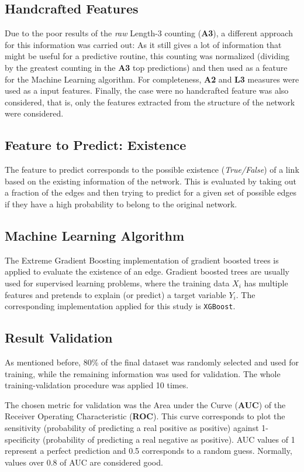 \subsection*{Handcrafted Features}

Due to the poor results of the \emph{raw} Length-3 counting (\textbf{A3}),
a different approach for this information was carried out: As it still
gives a lot of information that might be useful for a predictive routine,
this counting was normalized (dividing by the greatest counting in
the \textbf{A3} top predictions) and then used as a feature for the
Machine Learning algorithm. For completeness, \textbf{A2} and \textbf{L3}
measures were used as a input features. Finally, the case were no
handcrafted feature was also considered, that is, only the features
extracted from the structure of the network were considered.

\subsection*{Feature to Predict: Existence}

The feature to predict corresponds to the possible existence (\emph{True/False})
of a link based on the existing information of the network. This is
evaluated by taking out a fraction of the edges and then trying to
predict for a given set of possible edges if they have a high probability
to belong to the original network.

\subsection*{Machine Learning Algorithm}

The Extreme Gradient Boosting implementation of gradient boosted trees
is applied to evaluate the existence of an edge. Gradient boosted
trees are usually used for supervised learning problems, where the
training data $X_{i}$ has multiple features and pretends to explain
(or predict) a target variable $Y_{i}$. The corresponding implementation
applied for this study is \texttt{XGBoost}.

\subsection*{Result Validation}

As mentioned before, 80\% of the final dataset was randomly selected
and used for training, while the remaining information was used for
validation. The whole training-validation procedure was applied 10
times.

The chosen metric for validation was the Area under the Curve (\textbf{AUC})
of the Receiver Operating Characteristic (\textbf{ROC}). This curve
corresponds to plot the sensitivity (probability of predicting a real
positive as positive) against 1-specificity (probability of predicting
a real negative as positive). AUC values of 1 represent a perfect
prediction and 0.5 corresponds to a random guess. Normally, values
over 0.8 of AUC are considered good.
